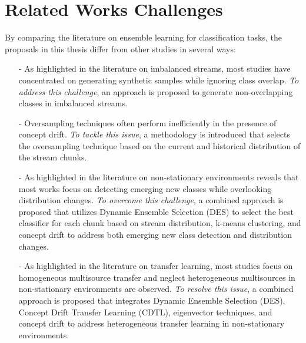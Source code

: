 \section{Related Works Challenges} 
\label{sec:3_7_remartks}

By comparing the literature on ensemble learning for classification tasks, the proposals in this thesis differ from other studies in several ways:

\begin{enumerate}
    
    \item [-] As highlighted in the literature on imbalanced streams, most studies have concentrated on generating synthetic samples while ignoring class overlap. \textit{To address this challenge}, an approach is proposed to generate non-overlapping classes in imbalanced streams.

    \item [-] Oversampling techniques often perform inefficiently in the presence of concept drift. \textit{To tackle this issue}, a methodology is introduced that selects the oversampling technique based on the current and historical distribution of the stream chunks.
    
    \item [-] As highlighted in the literature on non-stationary environments reveals that most works focus on detecting emerging new classes while overlooking distribution changes. \textit{To overcome this challenge}, a combined approach is proposed that utilizes Dynamic Ensemble Selection (DES) to select the best classifier for each chunk based on stream distribution, k-means clustering, and concept drift to address both emerging new class detection and distribution changes.
    
    \item [-] As highlighted in the literature on transfer learning, most studies focus on homogeneous multisource transfer and neglect heterogeneous multisources in non-stationary environments are observed. \textit{To resolve this issue}, a combined approach is proposed that integrates Dynamic Ensemble Selection (DES), Concept Drift Transfer Learning (CDTL), eigenvector techniques, and concept drift to address heterogeneous transfer learning in non-stationary environments.

\end{enumerate}

